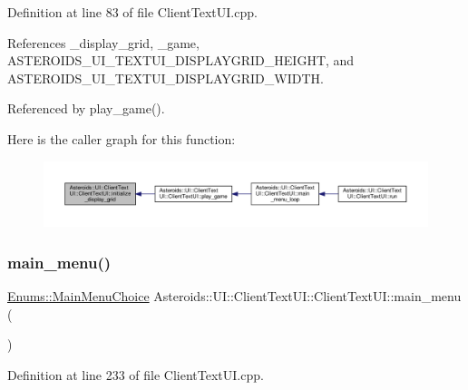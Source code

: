 Definition at line 83 of file Client\+Text\+U\+I.\+cpp.



References \+\_\+display\+\_\+grid, \+\_\+game, A\+S\+T\+E\+R\+O\+I\+D\+S\+\_\+\+U\+I\+\_\+\+T\+E\+X\+T\+U\+I\+\_\+\+D\+I\+S\+P\+L\+A\+Y\+G\+R\+I\+D\+\_\+\+H\+E\+I\+G\+HT, and A\+S\+T\+E\+R\+O\+I\+D\+S\+\_\+\+U\+I\+\_\+\+T\+E\+X\+T\+U\+I\+\_\+\+D\+I\+S\+P\+L\+A\+Y\+G\+R\+I\+D\+\_\+\+W\+I\+D\+TH.



Referenced by play\+\_\+game().

Here is the caller graph for this function\+:
\nopagebreak
\begin{figure}[H]
\begin{center}
\leavevmode
\includegraphics[width=350pt]{classAsteroids_1_1UI_1_1ClientTextUI_1_1ClientTextUI_a681a6bfc7d4438a4eb3cc146c9117125_icgraph}
\end{center}
\end{figure}
\mbox{\label{classAsteroids_1_1UI_1_1ClientTextUI_1_1ClientTextUI_a9d9c6942f7cf39ddb177df02fbe3e742}} 
\subsubsection{\texorpdfstring{main\+\_\+menu()}{main\_menu()}}
{\footnotesize\ttfamily \hyperlink{namespaceAsteroids_1_1UI_1_1ClientTextUI_1_1Enums_a009625aa8c73d3ab757537ad32c367b6}{Enums\+::\+Main\+Menu\+Choice} Asteroids\+::\+U\+I\+::\+Client\+Text\+U\+I\+::\+Client\+Text\+U\+I\+::main\+\_\+menu (\begin{DoxyParamCaption}{ }\end{DoxyParamCaption})\hspace{0.3cm}{\ttfamily [private]}}



Definition at line 233 of file Client\+Text\+U\+I.\+cpp.



